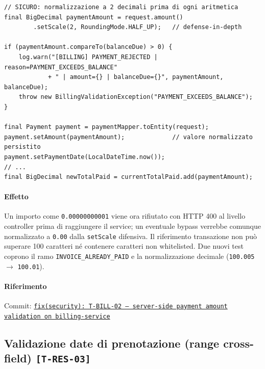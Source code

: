 ﻿\documentclass[a4paper,12pt]{report}
\newcommand{\commitref}[2]{\texttt{\small \href{https://github.com/diegoandruccioli/hotel-pms/commit/#1}{#2}}}
\newcommand{\threat}[1]{\texttt{\small\textcolor{vulnred}{[#1]}}}
\begin{document}
\begin{securebox}[title={Codice Sicuro --- PaymentServiceImpl.java (normalizzazione defense-in-depth)}]
\begin{lstlisting}[style=java]
// SICURO: normalizzazione a 2 decimali prima di ogni aritmetica
final BigDecimal paymentAmount = request.amount()
        .setScale(2, RoundingMode.HALF_UP);   // defense-in-depth

if (paymentAmount.compareTo(balanceDue) > 0) {
    log.warn("[BILLING] PAYMENT_REJECTED | reason=PAYMENT_EXCEEDS_BALANCE"
            + " | amount={} | balanceDue={}", paymentAmount, balanceDue);
    throw new BillingValidationException("PAYMENT_EXCEEDS_BALANCE");
}

final Payment payment = paymentMapper.toEntity(request);
payment.setAmount(paymentAmount);             // valore normalizzato persistito
payment.setPaymentDate(LocalDateTime.now());
// ...
final BigDecimal newTotalPaid = currentTotalPaid.add(paymentAmount);
\end{lstlisting}
\end{securebox}

\paragraph{Effetto}
Un importo come \texttt{0.00000000001} viene ora rifiutato con HTTP 400 al
livello controller prima di raggiungere il service; un eventuale bypass
verrebbe comunque normalizzato a \texttt{0.00} dalla
\texttt{setScale} difensiva. Il riferimento transazione non pu\`o superare
100 caratteri n\'e contenere caratteri non whitelisted.
Due nuovi test coprono il ramo \texttt{INVOICE\_ALREADY\_PAID} e la
normalizzazione decimale (\texttt{100.005} $\rightarrow$ \texttt{100.01}).

\paragraph{Riferimento} Commit: \commitref{d346fe8}{fix(security): T-BILL-02 --- server-side payment amount \\
validation on billing-service}

\subsection{Validazione date di prenotazione (range cross-field) \threat{T-RES-03}}
\end{document}

